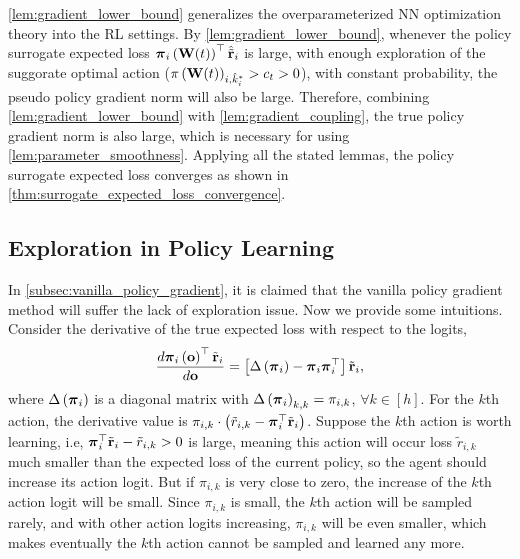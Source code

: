 \cref{lem:gradient_lower_bound} generalizes the overparameterized NN optimization theory into the RL settings. By \cref{lem:gradient_lower_bound}, whenever the policy surrogate expected loss ${\boldsymbol{\pi}}_i\left( {\mathbf{W}}(t) \right)^\top \hat{{\tilde{\mathbf{r}}}}_{i}$ is large, with enough exploration of the suggorate optimal action ($\pi\left({\mathbf{W}}(t)\right)_{i, \hat{k}_i^*} > c_t > 0$), with constant probability, the pseudo policy gradient norm will also be large. Therefore, combining \cref{lem:gradient_lower_bound} with \cref{lem:gradient_coupling}, the true policy gradient norm is also large, which is necessary for using \cref{lem:parameter_smoothness}. Applying all the stated lemmas, the policy surrogate expected loss converges as shown in \cref{thm:surrogate_expected_loss_convergence}.

\subsection{Exploration in Policy Learning}
\label{subsec:exploration_in_policy_learning}

In \cref{subsec:vanilla_policy_gradient}, it is claimed that the vanilla policy gradient method will suffer the lack of exploration issue. Now we provide some intuitions. Consider the derivative of the true expected loss with respect to the logits,
\begin{equation}
\label{eq:logit_derivative}
\begin{split}
    \frac{d {\boldsymbol{\pi}}_i\left( {\mathbf{o}} \right)^\top {\tilde{\mathbf{r}}}_i}{d {\mathbf{o}}} = \left[ \Delta\left( {\boldsymbol{\pi}}_i \right) - {\boldsymbol{\pi}}_i {\boldsymbol{\pi}}_i^\top \right] {\tilde{\mathbf{r}}}_i,
\end{split}
\end{equation}
where $\Delta\left( {\boldsymbol{\pi}}_i \right)$ is a diagonal matrix with $\Delta\left( {\boldsymbol{\pi}}_i \right)_{k,k} = \pi_{i,k}$, $\forall k \in [h]$. For the $k$th action, the derivative value is $\pi_{i,k} \cdot \left( \tilde{r}_{i,k} - {\boldsymbol{\pi}}_i^\top {\tilde{\mathbf{r}}}_i \right)$. Suppose the $k$th action is worth learning, i.e, ${\boldsymbol{\pi}}_i^\top {\tilde{\mathbf{r}}}_i - \tilde{r}_{i,k} > 0$ is large, meaning this action will occur loss $\tilde{r}_{i,k}$ much smaller than the expected loss of the current policy, so the agent should increase its action logit. But if $\pi_{i,k}$ is very close to zero, the increase of the $k$th action logit will be small. Since $\pi_{i,k}$ is small, the $k$th action will be sampled rarely, and with other action logits increasing, $\pi_{i,k}$ will be even smaller, which makes eventually the $k$th action cannot be sampled and learned any more.

